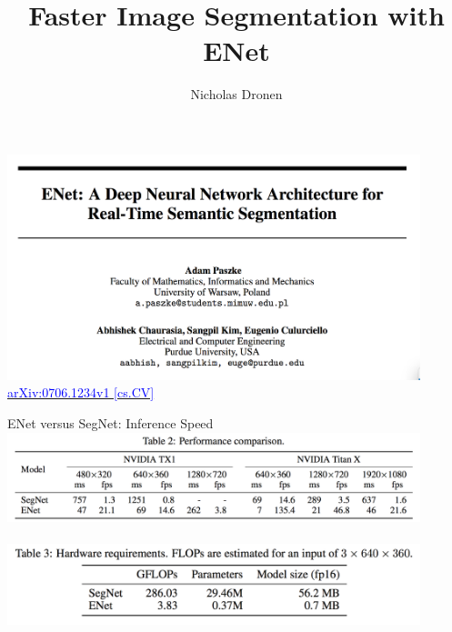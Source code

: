 \documentclass[]{beamer}
\begin{document}

\title{Faster Image Segmentation with ENet}
\author{Nicholas Dronen}

\begin{frame}
\maketitle
\end{frame}

%
%
%

\begin{frame}
\centering
\includegraphics[width=0.9\textwidth]{figures/enet-title} \\
\href{https://arxiv.org/abs/1606.02147}{\textcolor{blue}{arXiv:0706.1234v1 [cs.CV]}}
\end{frame}

\begin{frame}{ENet versus SegNet: Inference Speed}
\centering
\includegraphics[width=0.9\textwidth]{figures/enet-vs-segnet-speed} \\
\hspace*{\fill} \\
\includegraphics[width=0.9\textwidth]{figures/enet-vs-segnet-gflops-size}
\end{frame}
\end{document}

